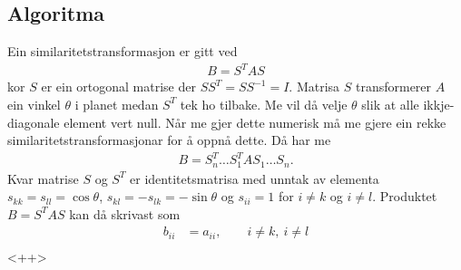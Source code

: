 \documentclass[11pt, a4paper]{article}
\begin{document}
  \subsection{Algoritma}
    Ein similaritetstransformasjon er gitt ved 
    \begin{align*}
      B = S^TAS
    \end{align*}
    kor $S$ er ein ortogonal matrise der $SS^T = SS^{-1} = I$. Matrisa $S$ transformerer $A$ ein vinkel $\theta$ i planet medan $S^T$ tek ho tilbake.
    Me vil då velje $\theta$ slik at alle ikkje-diagonale element vert null. Når me gjer dette numerisk må me gjere ein rekke similaritetstransformasjonar 
    for å oppnå dette. Då har me
    \begin{align*}
      B = S_n^T \dots S_1^TAS_1 \dots S_n.
    \end{align*}
    Kvar matrise $S$ og $S^T$ er identitetsmatrisa med unntak av elementa $s_{kk} = s_{ll} = \cos{\theta}$, $s_{kl} = -s_{lk} = -\sin{\theta}$ og 
    $s_{ii} = 1$ for $i \ne k$ og $i \ne l$. Produktet $B = S^TAS$ kan då skrivast som
    \begin{align*}
      b_{ii} &= a_{ii}, \qquad i \ne k, \ i \ne l \\

    \end{align*}<++>
\end{document}
